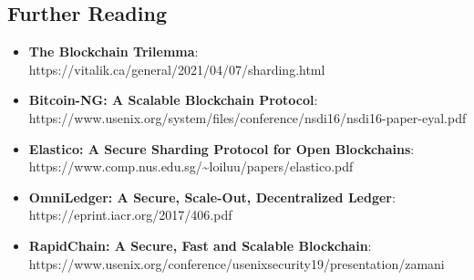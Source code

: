 \subsection{Further Reading}\label{further-reading}

\begin{itemize}
\tightlist
\item
  \textbf{The Blockchain Trilemma}:
  https://vitalik.ca/general/2021/04/07/sharding.html
\item
  \textbf{Bitcoin-NG: A Scalable Blockchain Protocol}:
  https://www.usenix.org/system/files/conference/nsdi16/nsdi16-paper-eyal.pdf
\item
  \textbf{Elastico: A Secure Sharding Protocol for Open Blockchains}:
  https://www.comp.nus.edu.sg/\textasciitilde loiluu/papers/elastico.pdf
\item
  \textbf{OmniLedger: A Secure, Scale-Out, Decentralized Ledger}:
  https://eprint.iacr.org/2017/406.pdf
\item
  \textbf{RapidChain: A Secure, Fast and Scalable Blockchain}:
  https://www.usenix.org/conference/usenixsecurity19/presentation/zamani
\end{itemize}